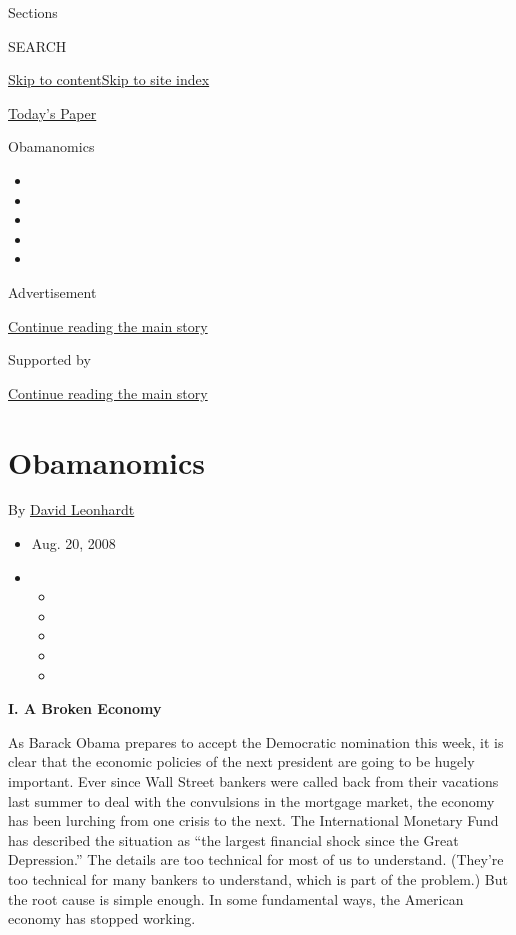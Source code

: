 Sections

SEARCH

\protect\hyperlink{site-content}{Skip to
content}\protect\hyperlink{site-index}{Skip to site index}

\href{https://myaccount.nytimes3xbfgragh.onion/auth/login?response_type=cookie\&client_id=vi}{}

\href{https://www.nytimes3xbfgragh.onion/section/todayspaper}{Today's
Paper}

Obamanomics

\begin{itemize}
\item
\item
\item
\item
\item
\end{itemize}

Advertisement

\protect\hyperlink{after-top}{Continue reading the main story}

Supported by

\protect\hyperlink{after-sponsor}{Continue reading the main story}

\hypertarget{obamanomics}{%
\section{Obamanomics}\label{obamanomics}}

By \href{https://www.nytimes3xbfgragh.onion/by/david-leonhardt}{David
Leonhardt}

\begin{itemize}
\item
  Aug. 20, 2008
\item
  \begin{itemize}
  \item
  \item
  \item
  \item
  \item
  \end{itemize}
\end{itemize}

\textbf{I. A Broken Economy}

As Barack Obama prepares to accept the Democratic nomination this week,
it is clear that the economic policies of the next president are going
to be hugely important. Ever since Wall Street bankers were called back
from their vacations last summer to deal with the convulsions in the
mortgage market, the economy has been lurching from one crisis to the
next. The International Monetary Fund has described the situation as
``the largest financial shock since the Great Depression.'' The details
are too technical for most of us to understand. (They're too technical
for many bankers to understand, which is part of the problem.) But the
root cause is simple enough. In some fundamental ways, the American
economy has stopped working.

